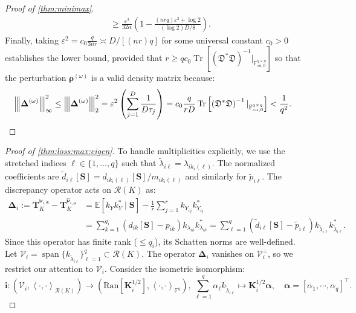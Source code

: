 \documentclass[noinfoline]{imsart}\setcounter{tocdepth}{2}
\renewcommand{\b}[1]{\mathbb{#1}} %
\newcommand{\m}[1]{\mathbf{#1}} %
\newcommand{\f}[1]{\mathfrak{#1}} %
\renewcommand{\c}[1]{\mathcal{#1}} %
\newcommand{\mb}[1]{\boldsymbol{#1}} %
\newcommand{\tr}[1]{\operatorname{Tr}\left[#1\right]}
\newcommand{\vertiii}[1]{{\left\vert\kern-0.25ex\left\vert\kern-0.25ex\left\vert #1 
    \right\vert\kern-0.25ex\right\vert\kern-0.25ex\right\vert}} %
\newcommand{\innpr}[2]{{\left\langle {#1},{#2}\right\rangle}} %
\DeclareMathOperator*{\spann}{span}
\theoremstyle{plain}
\begin{document}
\begin{appendix}
\begin{proof}[Proof of \cref{thm:minimax}]
\begin{align*}
    &\ge \frac{\varepsilon^{2}}{32 \alpha} \left(1 - \frac{(nrq) \varepsilon^{2} + \log 2}{(\log 2) D/8 } \right).
\end{align*}
Finally, taking $\varepsilon^{2} = c_{0} \frac{q}{3nr} \asymp D/[(n r) q]$ for some universal constant $c_{0} > 0$ establishes the lower bound, provided that $r \ge q c_{0} \tr{\left( \f{D}^{*} \f{D} \right)^{-1}|_{\b{F}_{sa, 0}^{q \times q}}}$ so that the perturbation $\mb{\rho}^{(\omega)}$ is a valid density matrix because:
\begin{align*}
    \vertiii{\mb{\Delta}^{(\omega)}}_{\infty}^{2} \le \vertiii{\mb{\Delta}^{(\omega)}}_{2}^{2} = \varepsilon^{2} \left( \sum_{j=1}^{D} \frac{1}{D \tau_{j}} \right) &= c_{0} \frac{q}{r D} \tr{\left(\f{D}^{*} \f{D} \right)^{-1}|_{\b{F}_{sa, 0}^{q \times q}}}  < \frac{1}{q^{2}}.
\end{align*}
\end{proof}


\begin{proof}[Proof of \cref{thm:loss:max:eigen}]
To handle multiplicities explicitly, we use the stretched indices $\ell \in \{1, \dots, q\}$ such that $\tilde{\lambda}_{i\ell} = \lambda_{i k_{i}(\ell)}$. The normalized coefficients are $\tilde{d}_{i\ell}[\m{S}] = d_{i k_{i}(\ell)}[\m{S}]/m_{i k_{i}(\ell)}$ and similarly for $\tilde{p}_{i\ell}$. The discrepancy operator acts on $\c{R}(K)$ as:
\begin{align*}
    \mb{\Delta}_{i} := \m{T}_{K}^{\mb{\nu}_{i, \m{S}}} - \m{T}_{K}^{\hat{\mb{\nu}}_{i, \mb{\rho}}} &= \b{E}[k_{Y} k_{Y}^{*} \mid \m{S}] - \frac{1}{r} \sum_{j=1}^{r} k_{Y_{ij}} k_{Y_{ij}}^{*} \\
    &= \sum_{k=1}^{q_{i}} (d_{ik}[\m{S}] - p_{ik}) k_{\lambda_{ik}} k_{\lambda_{ik}}^{*} = \sum_{\ell=1}^{q} (\tilde{d}_{i\ell}[\m{S}] - \tilde{p}_{i\ell}) k_{\tilde{\lambda}_{i\ell}} k_{\tilde{\lambda}_{i\ell}}^{*}.
\end{align*}
Since this operator has finite rank ($\le q_i$), its Schatten norms are well-defined. Let $\c{V}_{i} = \spann \{k_{\tilde{\lambda}_{i\ell}}\}_{\ell=1}^q \subset \c{R}(K)$. The operator $\mb{\Delta}_i$ vanishes on $\c{V}_{i}^{\perp}$, so we restrict our attention to $\c{V}_i$.
Consider the isometric isomorphism: 
\begin{equation*}
    \m{i} : (\c{V}_{i}, \innpr{\cdot}{\cdot}_{\c{R}(K)}) \to (\text{Ran}[\m{K}_{i}^{1/2}], \innpr{\cdot}{\cdot}_{\b{F}^{q}}), \, \sum_{\ell=1}^{q} \alpha_{\ell} k_{\tilde{\lambda}_{i\ell}} \mapsto \m{K}_{i}^{1/2} \mb{\alpha}, \quad \mb{\alpha} = [\alpha_{1}, \cdots, \alpha_{q}]^{\top}.
\end{equation*}


\end{proof}
\end{appendix}
\end{document}
